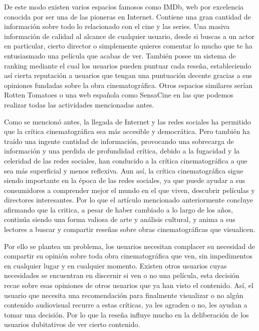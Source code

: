 De este modo existen varios espacios famosos como IMDb\cite{IMDbWeb}, web por excelencia conocida por 
ser una de las pioneras en Internet. Contiene una gran cantidad de información sobre todo lo 
relacionado con el cine y las series. Una masiva información de calidad al alcance de cualquier 
usuario, desde si buscas a un actor en particular, cierto director o simplemente quieres comentar lo 
mucho que te ha entusiasmado una película que acabas de ver. También posee un sistema de ranking 
mediante el cual los usuarios pueden puntuar cada reseña, estableciendo así cierta reputación a 
usuarios que tengan una puntuación decente gracias a sus opiniones fundadas sobre la obra 
cinematográfica. Otros espacios similares serían Rotten Tomatoes\cite{RottenTWeb} o una web española 
como SensaCine\cite{SSweb} en las que podemos realizar todas las actividades mencionadas antes.

Como se mencionó antes, la llegada de Internet y las redes sociales ha permitido que la crítica 
cinematográfica sea más accesible y democrática. Pero también ha traído una ingente cantidad de 
información, provocando una sobrecarga de información y una perdida de profundidad crítica, debido a la 
fugacidad y la celeridad de las redes sociales, han conducido a la crítica cinematográfica a que sea 
más superficial y menos reflexiva. Aun así, la crítica cinematográfica sigue siendo importante en la 
época de las redes sociales, ya que puede ayudar a sus consumidores a comprender mejor el mundo en el 
que viven, descubrir películas y directores interesantes. Por lo que el artículo mencionado 
anteriormente concluye afirmando que la critica, a pesar de haber cambiado a lo largo de los años, 
continúa siendo una forma valiosa de arte y análisis cultural, y anima a sus lectores a buscar y 
compartir reseñas sobre obras cinematográficas que visualicen.

Por ello se plantea un problema, los usuarios necesitan complacer su necesidad de compartir su opinión 
sobre toda obra cinematográfica que ven, sin impedimentos en cualquier lugar y en cualquier momento. 
Existen otros usuarios cuyas necesidades se encuentran en discernir si ven o no una película, esta 
decisión recae sobre esas opiniones de otros usuarios que ya han visto el contenido. Así, el usuario 
que necesita una recomendación para finalmente visualizar o no algún contenido audiovisual recurre a 
estas críticas, ya les agraden o no, les ayudan a tomar una decisión. Por lo que la reseña influye mucho 
en la deliberación de los usuarios dubitativos de ver cierto contenido.

